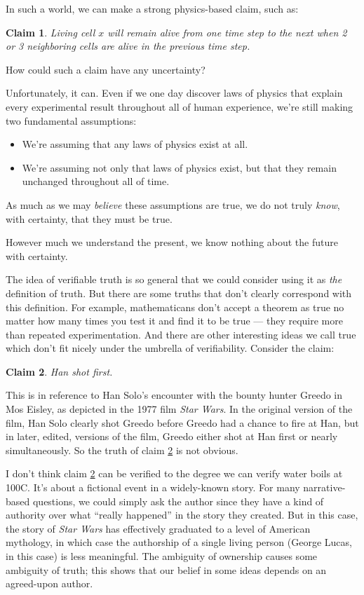 \documentclass[11pt, oneside]{article}   	%
\newtheorem{claim}{Claim}
\begin{document}
\pagebreak

In such a world, we can make a strong physics-based claim, such as:
\begin{claim}
    Living cell $x$ will remain alive from one time step to the next when 2 or 3
    neighboring cells are alive in the previous time step.
\end{claim}

How could such a claim have any uncertainty?

Unfortunately, it can. Even if we one day discover laws of physics that
explain every experimental result throughout all of human
experience, we're still making two fundamental assumptions:
\begin{itemize}
    \item We're assuming that any laws of physics exist at all.
    \item We're assuming not only that laws of physics exist, but that they
        remain unchanged throughout all of time.
\end{itemize}
As much as we may {\em believe} these assumptions are true, we do not truly {\em
know}, with certainty, that they must be true.

However much we understand the present, we know nothing about
the future with certainty.

The idea of verifiable truth is so general that we could consider using it as
{\em the} definition of truth.
But there are some truths that don't clearly correspond with this definition.
For example, mathematicans don't accept a theorem as true no
matter how many times you test it and find it to be true --- they require
more than repeated experimentation.
And there are other interesting ideas we call true
which don't fit nicely under the umbrella of verifiability.
Consider the claim:
\begin{claim}\label{c2}
    Han shot first.
\end{claim}
This is in reference to Han Solo's encounter with the bounty hunter Greedo in
Mos Eisley, as depicted in the 1977 film {\em Star Wars}.
In the original version of the film, Han Solo clearly shot Greedo before Greedo
had a chance to
fire at Han, but in later, edited, versions of the film, Greedo either shot at
Han first or nearly simultaneously. So the truth of claim \ref{c2} is not
obvious.

I don't think claim \ref{c2} can be verified to the degree we can verify
water boils at 100\degree C.
It's about a fictional event in a widely-known story.
For many narrative-based questions, we could simply ask the author since they
have a kind of authority over what ``really happened'' in the story they
created. But in this case, the story of {\em Star Wars} has effectively
graduated to a level of American mythology, in which case the authorship of a
single living person (George Lucas, in this case) is less meaningful.
The ambiguity of ownership causes some ambiguity of truth;
this shows that our belief in some ideas depends on an agreed-upon author.
\end{document}
